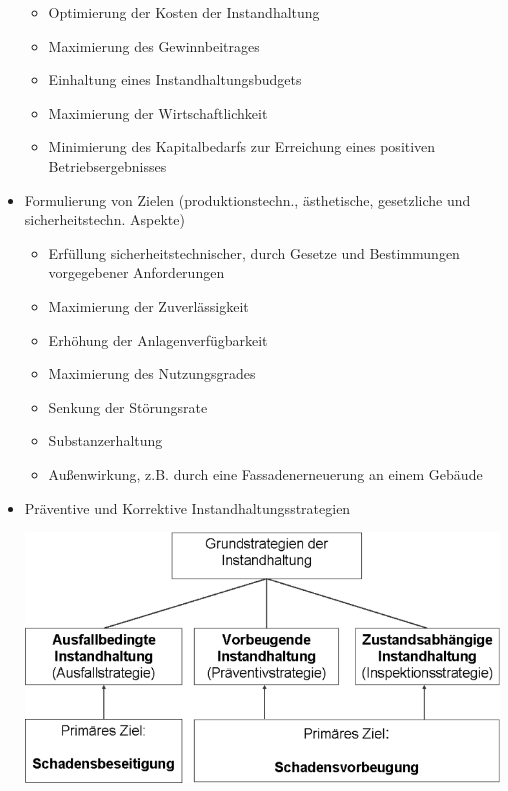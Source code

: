 \documentclass[fleqn,twoside,dvipsnames]{article}
\begin{document}
\begin{itemize}
\begin{itemize}
                    \item Optimierung der Kosten der Instandhaltung
                    \item Maximierung des Gewinnbeitrages
                    \item Einhaltung eines Instandhaltungsbudgets
                    \item Maximierung der Wirtschaftlichkeit
                    \item Minimierung des Kapitalbedarfs zur Erreichung eines positiven Betriebsergebnisses
                \end{itemize}
            \item Formulierung von Zielen (produktionstechn., ästhetische, gesetzliche und sicherheitstechn. Aspekte)
                \begin{itemize}
                    \item Erfüllung sicherheitstechnischer, durch Gesetze und Bestimmungen vorgegebener Anforderungen
                    \item Maximierung der Zuverlässigkeit
                    \item Erhöhung der Anlagenverfügbarkeit
                    \item Maximierung des Nutzungsgrades
                    \item Senkung der Störungsrate
                    \item Substanzerhaltung
                    \item Außenwirkung, z.B. durch eine Fassadenerneuerung an einem Gebäude
                \end{itemize}
            \item Präventive und Korrektive Instandhaltungsstrategien \label{Instandhaltungsstrategien}\\
                        \begin{minipage}{0.45\textwidth}
                            \includegraphics[width=0.99\textwidth]{Grafiken/Instandhaltung/Grundstrategien der Instandhaltung.png}

\end{minipage}
\end{itemize}
\end{document}
